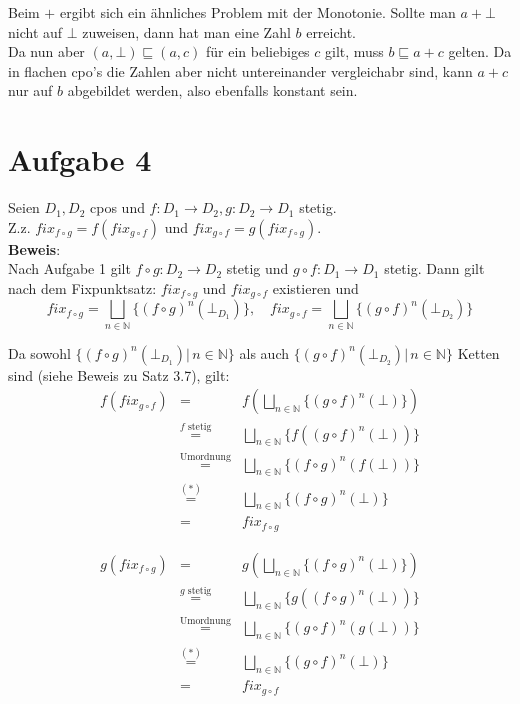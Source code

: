 \documentclass[11pt,a4paper,ngerman]{article}
\begin{document}
Beim $+$ ergibt sich ein ähnliches Problem mit der Monotonie. Sollte man $a + \bot$ nicht auf $\bot$ zuweisen, dann hat man eine Zahl $b$ erreicht.\\
Da nun aber $(a,\bot) \sqsubseteq (a,c)$ für ein beliebiges $c$ gilt, muss $b \sqsubseteq a+c$ gelten. Da in flachen cpo's die Zahlen aber nicht
untereinander vergleichabr sind, kann $a+c$ nur auf $b$ abgebildet werden, also ebenfalls konstant sein.

\pagebreak


\section*{Aufgabe 4}
Seien $D_1, D_2$ cpos und $f: D_1 \to D_2, g: D_2 \to D_1$ stetig.\\
Z.z. $fix_{f\circ g} = f(fix_{g\circ f})$ und $fix_{g\circ f} = g(fix_{f\circ g})$.\\

\textbf{Beweis}:\\
Nach Aufgabe 1 gilt $f \circ g : D_2 \to D_2$ stetig und $g \circ f : D_1 \to D_1$ stetig. Dann gilt nach dem Fixpunktsatz: $fix_{f \circ g}$ und $fix_{g \circ f}$ existieren und
$$fix_{f \circ g} = \bigsqcup_{n \in \mathbb{N}} \{(f \circ g)^n(\bot_{D_1}) \}, \quad fix_{g \circ f} = \bigsqcup_{n \in \mathbb{N}} \{(g \circ f)^n(\bot_{D_2}) \}$$

Da sowohl $\{(f \circ g)^n(\bot_{D_1}) |\, n\in \mathbb{N}\}$ als auch $\{(g \circ f)^n(\bot_{D_2}) |\, n\in \mathbb{N}\}$ Ketten sind (siehe Beweis zu Satz 3.7), gilt:\\

\begin{eqnarray*}
f (fix_{g \circ f}) &=& f(\bigsqcup_{n \in \mathbb{N}} \{(g \circ f)^n(\bot) \}) \\
&\stackrel{f \text{ stetig}}{=}& \bigsqcup_{n \in \mathbb{N}} \{f((g \circ f)^n(\bot)) \}\\
&\stackrel{\text{Umordnung}}{=}& \bigsqcup_{n \in \mathbb{N}} \{(f \circ g)^n(f(\bot)) \}\\
&\stackrel{(*)}{=}& \bigsqcup_{n \in \mathbb{N}} \{(f \circ g)^n(\bot) \}\\
&=& fix_{f\circ g}
\end{eqnarray*}

\begin{eqnarray*}
g (fix_{f \circ g}) &=& g(\bigsqcup_{n \in \mathbb{N}} \{(f \circ g)^n(\bot) \}) \\
&\stackrel{g \text{ stetig}}{=}& \bigsqcup_{n \in \mathbb{N}} \{g((f \circ g)^n(\bot)) \}\\
&\stackrel{\text{Umordnung}}{=}& \bigsqcup_{n \in \mathbb{N}} \{(g \circ f)^n(g(\bot)) \}\\
&\stackrel{(*)}{=}& \bigsqcup_{n \in \mathbb{N}} \{(g \circ f)^n(\bot) \}\\
&=& fix_{g\circ f}
\end{eqnarray*}
\end{document}

